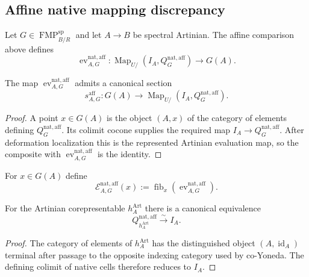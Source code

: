 \subsection{Affine native mapping discrepancy}

Let $G\in\operatorname{FMP}^{\mathrm{sp}}_{B/R}$ and let $A\to B$ be spectral
Artinian.  The affine comparison above defines
\[
\boxed{
    \operatorname{ev}^{\mathrm{nat,aff}}_{A,G}:
    \operatorname{Map}_{U/}(I_A,Q_G^{\mathrm{nat,aff}})
    \longrightarrow
    G(A).}
\]

\begin{proposition}
\label{prop:bnli-affine-native-evaluation-section}
The map $\operatorname{ev}^{\mathrm{nat,aff}}_{A,G}$ admits a canonical section
\[
    s^{\mathrm{aff}}_{A,G}:
    G(A)
    \longrightarrow
    \operatorname{Map}_{U/}(I_A,Q_G^{\mathrm{nat,aff}}).
\]
\end{proposition}

\begin{proof}
A point $x\in G(A)$ is the object $(A,x)$ of the category of elements defining
$Q_G^{\mathrm{nat,aff}}$.  Its colimit cocone supplies the required map
$I_A\to Q_G^{\mathrm{nat,aff}}$.  After deformation localization this is the
represented Artinian evaluation map, so the composite with
$\operatorname{ev}^{\mathrm{nat,aff}}_{A,G}$ is the identity.
\end{proof}

\begin{definition}
\label{def:bnli-affine-native-cell-discrepancy}
For $x\in G(A)$ define
\[
\boxed{
    \mathscr E^{\mathrm{nat,aff}}_{A,G}(x)
    :=
    \operatorname{fib}_{x}
    \left(
      \operatorname{ev}^{\mathrm{nat,aff}}_{A,G}
    \right).}
\]
\end{definition}

\begin{lemma}
\label{lem:bnli-affine-corepresentable-cell}
For the Artinian corepresentable $h_A^{\mathrm{Art}}$ there is a canonical
equivalence
\[
    Q_{h_A^{\mathrm{Art}}}^{\mathrm{nat,aff}}
    \xrightarrow{\sim}
    I_A.
\]
\end{lemma}

\begin{proof}
The category of elements of $h_A^{\mathrm{Art}}$ has the distinguished object
$(A,\operatorname{id}_A)$ terminal after passage to the opposite indexing
category used by co-Yoneda.  The defining colimit of native cells therefore
reduces to $I_A$.
\end{proof}

